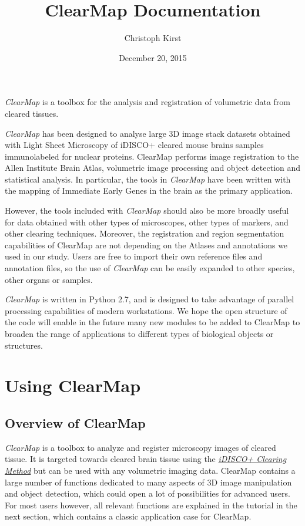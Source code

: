 \documentclass[letterpaper,10pt,english]{sphinxmanual}
\title{ClearMap Documentation}
\date{December 20, 2015}
\author{Christoph Kirst}
\begin{document}
\maketitle
\tableofcontents
{}\label{index::doc}


\emph{ClearMap} is a toolbox for the analysis and registration of volumetric data
from cleared tissues.

\emph{ClearMap} has been designed to analyse large 3D image stack datasets obtained with Light Sheet Microscopy
of iDISCO+ cleared mouse brains samples immunolabeled for nuclear proteins. ClearMap performs image registration to the Allen Institute Brain Atlas, volumetric image processing and object detection and statistical analysis. In particular, the tools in \emph{ClearMap} have been written with the mapping of Immediate Early Genes in the brain as the primary application.

However, the tools included with \emph{ClearMap} should also be more broadly useful for data obtained with other types of microscopes, other types of markers, and other clearing techniques. Moreover, the registration and region segmentation capabilities of ClearMap are not depending on the Atlases and annotations we used in our study. Users are free to import their own reference files and annotation files, so the use of \emph{ClearMap} can be easily expanded to other species, other organs or samples.

\emph{ClearMap} is written in Python 2.7, and is designed to take advantage of parallel processing capabilities of modern workstations. We hope the open structure of the code will enable in the future many new modules to be added to ClearMap to broaden the range of applications to different types of biological objects or structures.


\chapter{Using ClearMap}
\label{index:using-clearmap}\label{index:clearmap}

\section{Overview of ClearMap}
\label{introduction::doc}\label{introduction:overview-of-clearmap}
\emph{ClearMap} is a toolbox to analyze and register microscopy images of cleared
tissue. It is targeted towards cleared brain tissue using the {\hyperref[introduction:idisco-clearing-method]{\emph{iDISCO+ Clearing Method}}}
but can be used with any volumetric imaging data. ClearMap contains a large number of functions dedicated to many aspects of 3D image manipulation and object detection, which could open a lot of possibilities for advanced users. For most users however, all relevant functions are explained in the tutorial in the next section, which contains a classic application case for ClearMap.
\end{document}

